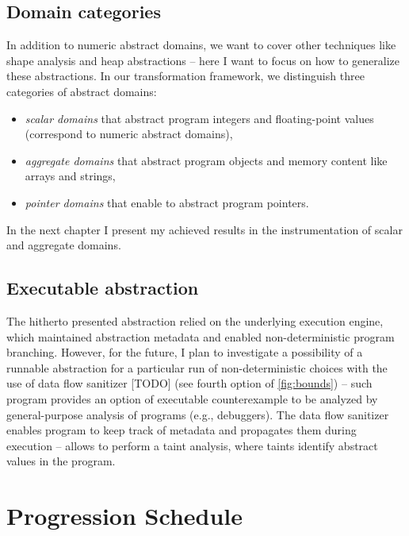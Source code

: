 
\subsection{ Domain categories }

In addition to numeric abstract domains, we want to cover other techniques like
shape analysis and heap abstractions -- here I want to focus on how to
generalize these abstractions. In our transformation framework, we distinguish
three categories of abstract domains:

\begin{itemize}
    \item \emph{scalar domains} that abstract program integers and floating-point values (correspond to numeric abstract domains),
    \item \emph{aggregate domains} that abstract program objects and memory content like arrays and strings,

    \item \emph{pointer domains} that enable to abstract program pointers.
\end{itemize}

In the next chapter I present my achieved results in the instrumentation of scalar and aggregate domains.



\subsection{ Executable abstraction }

The hitherto presented abstraction relied on the underlying execution engine,
which maintained abstraction metadata and enabled non-deterministic program
branching. However, for the future, I plan to investigate a possibility of a
runnable abstraction for a particular run of non-deterministic choices with the
use of data flow sanitizer [TODO] (see fourth option of \autoref{fig:bounds})
-- such program provides an option of executable counterexample to be analyzed
by general-purpose analysis of \llvm programs (e.g., debuggers).  The data flow
sanitizer enables program to keep track of metadata and propagates them during
execution -- allows to perform a taint analysis, where taints identify abstract
values in the program.



\section{Progression Schedule}







